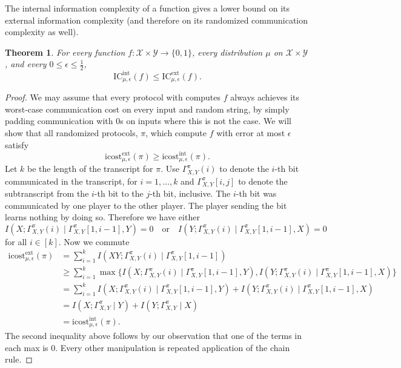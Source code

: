 \documentclass[11pt]{amsart}
\theoremstyle{plain}
\newtheorem{theorem}{Theorem}
\theoremstyle{definition}
\theoremstyle{plain}
\newcommand{\calX}{\mathcal{X}}
\newcommand{\calY}{\mathcal{Y}}
\newcommand{\ICext}{\mathrm{IC}^{\mathrm{ext}}}
\newcommand{\ICint}{\mathrm{IC}^{\mathrm{int}}}
\newcommand{\icostext}{\mathrm{icost}^{\mathrm{ext}}}
\newcommand{\icostint}{\mathrm{icost}^{\mathrm{int}}}
\begin{document}
The internal information complexity of a function gives a lower bound on its external information complexity (and therefore on its randomized communication complexity as well).

\begin{theorem}
For every function $f : \calX \times \calY \to \{0,1\}$, every distribution $\mu$ on $\calX \times \calY$, and every $0 \le \epsilon \le \frac12$,
\[
\ICint_{\mu,\epsilon}(f) \le \ICext_{\mu,\epsilon}(f).
\]
\end{theorem}

\begin{proof}
We may assume that every protocol with computes $f$ always achieves its worst-case communication cost on every input and random string, by simply padding communication with $0$s on inputs where this is not the case. We will show that all randomized protocols, $\pi$, which compute $f$ with error at most $\epsilon$ satisfy
$$\icostext_{\mu,\epsilon}(\pi) \geq \icostint_{\mu,\epsilon}(\pi).$$
Let $k$ be the length of the transcript for $\pi$. Use $\Gamma^\pi_{X,Y}(i)$ to denote the $i$-th bit communicated in the transcript, for $i=1,\dots, k$ and $\Gamma^\pi_{X,Y}[i,j]$ to denote the subtranscript from the $i$-th bit to the $j$-th bit, inclusive. The $i$-th bit was communicated by one player to the other player. The player sending the bit learns nothing by doing so. Therefore we have either
$$I(X;\Gamma^\pi_{X,Y}(i) \mid \Gamma^{\pi}_{X,Y}[1,i-1], Y) = 0 \quad\text{or}\quad I(Y;\Gamma^\pi_{X,Y}(i) \mid \Gamma^{\pi}_{X,Y}[1,i-1], X) = 0 $$
for all $i\in[k]$.
Now we commute
\begin{align*}
\icostext_{\mu,\epsilon}(\pi) &= \sum_{i=1}^k I(XY;\Gamma^\pi_{X,Y}(i) \mid \Gamma^\pi_{X,Y}[1,i-1]) \\
&\geq \sum_{i=1}^k\max\{I(X;\Gamma^\pi_{X,Y}(i) \mid \Gamma^{\pi}_{X,Y}[1,i-1], Y), I(Y;\Gamma^\pi_{X,Y}(i) \mid \Gamma^{\pi}_{X,Y}[1,i-1], X)\}\\
&=\sum_{i=1}^k I(X;\Gamma^\pi_{X,Y}(i) \mid \Gamma^{\pi}_{X,Y}[1,i-1], Y)+ I(Y;\Gamma^\pi_{X,Y}(i) \mid \Gamma^{\pi}_{X,Y}[1,i-1], X) \\
&= I(X;\Gamma^\pi_{X,Y} \mid Y) + I(Y; \Gamma^\pi_{X,Y} \mid X) \\
&= \icostint_{\mu,\epsilon}(\pi).
\end{align*}
The second inequality above follows by our observation that one of the terms in each max is $0$. Every other manipulation is repeated application of the chain rule.
\end{proof}
\end{document}
